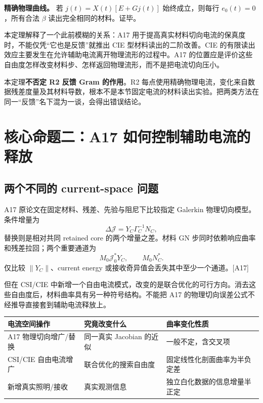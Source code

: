 \documentclass[10pt,a4paper]{article}
\begin{document}
\textbf{精确物理曲线。} 若 \(j(t)=X(t)[E+Gj(t)]\) 始终成立，则每行
\(e_0(t)=0\)，所有合法 \(\beta\) 读出完全相同的材料。证毕。

本定理解释了一个此前模糊的关系：A17
用于提高真实材料切向电流的保真度时，不能仅凭``它也是反馈''就推出 CIE
型材料读出的二阶改善。CIE
的有限读出效应主要发生在允许辅助电流离开物理流形的过程中。A17
的位置应是评价这些自由度怎样改变材料步、怎样返回物理流形，而不是把电流切向压小。

本定理\textbf{不否定 R2 反馈 Gram 的作用}。R2
每点使用精确物理电流，变化来自数据残差度量及其材料导数，根本不是本节固定电流的材料读出实验。把两类方法在同一``反馈''名下混为一谈，会得出错误结论。

\hypertarget{ux6838ux5fc3ux547dux9898ux4e8ca17-ux5982ux4f55ux63a7ux5236ux8f85ux52a9ux7535ux6d41ux7684ux91caux653e}{%
\section{核心命题二：A17
如何控制辅助电流的释放}\label{ux6838ux5fc3ux547dux9898ux4e8ca17-ux5982ux4f55ux63a7ux5236ux8f85ux52a9ux7535ux6d41ux7684ux91caux653e}}

\hypertarget{ux4e24ux4e2aux4e0dux540cux7684-current-space-ux95eeux9898}{%
\subsection{两个不同的 current-space
问题}\label{ux4e24ux4e2aux4e0dux540cux7684-current-space-ux95eeux9898}}

A17 原论文在固定材料、残差、先验与阻尼下比较指定 Galerkin
物理切向模型。条件增量为 \[\Delta\mathcal J=Y_C\Gamma_C^{-1}N_C,\]
替换则是相对共同 retained core 的两个增量之差。材料 GN
步同时依赖响应曲率和残差拉回；两个重要通道为
\[M_0\mathcal J_0^*Y_C,\qquad M_0N_C^*.\] 仅比较 \(\|Y_C\|\)、current
energy 或接收奇异值会丢失其中至少一个通道。{[}A17{]}

但在 CSI/CIE
中新增一个自由电流模式，改变的是联合优化的可行方向。消去这些自由度后，材料曲率具有另一种符号结构。不能把
A17 的物理切向误差公式不经推导直接套到辅助电流释放上。

\begin{longtable}[]{@{}lll@{}}
\toprule\noalign{}
电流空间操作 & 究竟改变什么 & 曲率变化性质 \\
\midrule\noalign{}
\endhead
\bottomrule\noalign{}
\endlastfoot
A17 物理切向增广/替换 & 同一真实 Jacobian 的近似 & 一般不定，含交叉项 \\
CSI/CIE 自由电流增广 & 联合优化的搜索自由度 &
固定线性化剖面曲率为半负定差 \\
新增真实照明/接收 & 真实观测信息 & 独立白化数据的信息增量半正定 \\
\end{longtable}
\end{document}
